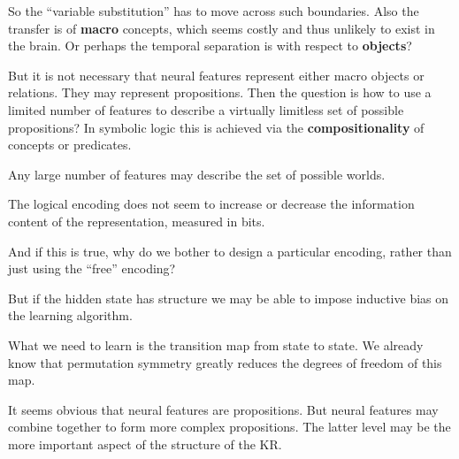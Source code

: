 So the ``variable substitution'' has to move across such boundaries.  Also the transfer is of \textbf{macro} concepts, which seems costly and thus unlikely to exist in the brain.  Or perhaps the temporal separation is with respect to \textbf{objects}? 

But it is not necessary that neural features represent either macro objects or relations.  They may represent propositions.  Then the question is how to use a limited number of features to describe a virtually limitless set of possible propositions?  In symbolic logic this is achieved via the \textbf{compositionality} of concepts or predicates.

Any large number of features may describe the set of possible worlds.  

The logical encoding does not seem to increase or decrease the information content of the representation, measured in bits.

And if this is true, why do we bother to design a particular encoding, rather than just using the ``free'' encoding?

But if the hidden state has structure we may be able to impose inductive bias on the learning algorithm.

What we need to learn is the transition map from state to state.  We already know that permutation symmetry greatly reduces the degrees of freedom of this map.

It seems obvious that neural features are propositions.  But neural features may combine together to form more complex propositions.  The latter level may be the more important aspect of the structure of the KR.



